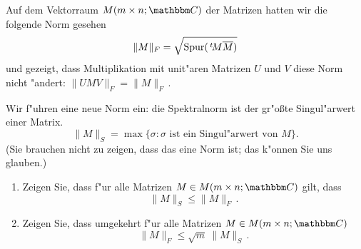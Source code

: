 \documentclass[a4,11pt]{article}
\begin{document}
\newpage

\begin{aufgabe}
Auf dem Vektorraum $M(m \times n; \C)$ der Matrizen hatten wir die
folgende Norm gesehen
\[
\| M \|_F = \sqrt{\text{Spur}(\,^t\!M \overline{M})}
\]
und gezeigt, dass Multiplikation mit unit"aren Matrizen $U$
und $V$
diese Norm nicht "andert:
$\| UMV \|_F = \| M \|_F$\,.

Wir f"uhren eine neue Norm ein: die Spektralnorm ist der gr"oßte
Singul"arwert einer Matrix.
\[
\| M \|_S = \max \{ \sigma : \sigma \text{ ist ein Singul"arwert von } M \}.
\]
(Sie brauchen nicht zu zeigen, dass das eine Norm ist; das k"onnen Sie
uns glauben.)
\begin{enumerate}
\item
Zeigen Sie, dass f"ur alle Matrizen $M \in M(m \times n; \C)$ gilt,
dass
\[
\| M \|_S \leq \| M \|_F \,.
\]
\item
  Zeigen Sie, dass umgekehrt f"ur alle Matrizen $M \in M(m \times n;
  \C)$
\[
\| M \|_F \leq \sqrt{m} \ \| M \|_S \,.
\]
\end{enumerate}

\end{aufgabe}

\newpage
\end{document}
